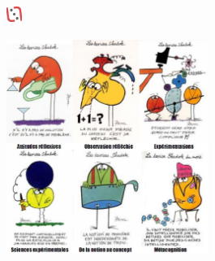 \documentclass[slidetop,11pt]{beamer}
\def\moreInFrameTitleLeftt{\includegraphics[height=0.5cm]{img/ligueludique-0.png}~~~~~}
\begin{document}
\subsection{\sectionPartIIIc}
\begin{frame}
	\frametitle{\moreInFrameTitleLeftt \sectionPartIIIc}
	\begin{center}
		\includegraphics[height=7.0cm]{img/shadoks_devises.png} %
	\end{center}
\end{frame}


\def\sectionPartIIIe{"D{\'e}bats et controverses" / "Cicada 3301", un ARG ?}
\end{document}
